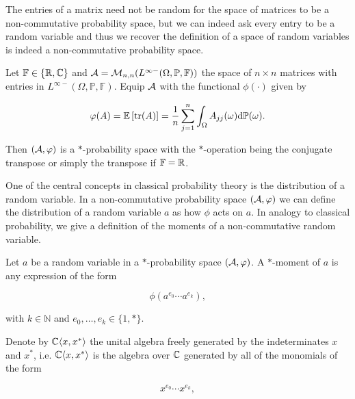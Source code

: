     The entries of a matrix need not be random for the space of matrices to be a non-commutative probability space, but we can indeed ask every entry to be a random variable and thus we recover the definition of a space of random variables is indeed a non-commutative probability space.

    \begin{example}
        Let  $\mathbb F \in \{\mathbb R,\mathbb C\}$ and $\mathcal A = \mathcal M_{n,n}(L^{\infty-}(\Omega,\mathbb P,\mathbb F))$ the space of $n\times n$ matrices with entries in $L^{\infty-}(\Omega,\mathbb P,\mathbb F)$. Equip $\mathcal A$ with the functional $\phi(\cdot)$ given by

        \begin{equation*}
            \varphi(A) = \mathbb E \left[  \mathrm{tr}(A)  \right] = \frac1n\sum_{j=1}^n \int_{\Omega} A_{jj}(\omega) \mathrm d \mathbb P(\omega).
        \end{equation*}

        Then $(\mathcal A, \varphi)$ is a $*$-probability space with the $*$-operation being the conjugate transpose or simply the transpose if $\mathbb F = \mathbb R$.
    \end{example}

    One of the central concepts in classical probability theory is the distribution of a random variable. In a non-commutative probability space $(\mathcal A,\varphi)$ we can define the distribution of a random variable $a$ as how $\phi$ acts on $a$. In analogy to classical probability, we give a definition of the moments of a non-commutative random variable.

    \begin{definition} \label{def:star_moment}
        Let $a$ be a random variable in a $*$-probability space $(\mathcal A,\varphi)$. A $*$-moment of $a$ is any expression of the form

        \begin{equation*}
            \phi(a^{e_0}\cdots a^{e_k}),
        \end{equation*}

        \noindent with $k \in \mathbb{N}$ and $e_0, \dots, e_k \in \{1,*\}$.
    \end{definition}

    Denote by $\mathbb C\langle x, x^*\rangle$ the unital algebra freely generated by the indeterminates $x$ and $x^*$, i.e. $\mathbb C\langle x,x^*\rangle$ is the algebra over $\mathbb C$ generated by all of the monomials of the form

    \begin{equation*}
        x^{e_0}\cdots x^{e_k},
    \end{equation*}

